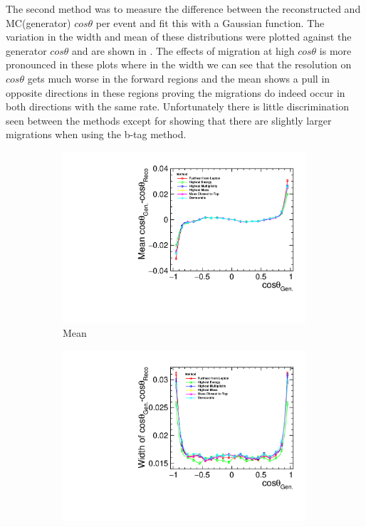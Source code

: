 The second method was to measure the difference between the reconstructed and MC(generator) $cos\theta$ per event and fit this with a Gaussian function. The variation in the width and mean of these distributions were plotted against the generator $cos\theta$ and are shown in . The effects of migration at high $cos\theta$ is more pronounced in these plots where in the width we can see that the resolution on $cos\theta$ gets much worse in the forward regions and the mean shows a pull in opposite directions in these regions proving the migrations do indeed occur in both directions with the same rate. Unfortunately there is little discrimination seen between the methods except for showing that there are slightly larger migrations when using the b-tag method.

\begin{figure}
  \centering
  \begin{subfigure}{.8\textwidth}
    \centering
    \includegraphics[width=0.99\textwidth]{TopAnalysis/figures/MeanThetaDiff.pdf}
    \caption[Mean]{Mean}
  \end{subfigure}
  \begin{subfigure}{.8\textwidth}
    \centering
    \includegraphics[width=0.99\textwidth]{TopAnalysis/figures/WidthThetaDiff.pdf}

\end{subfigure}
\end{figure}
